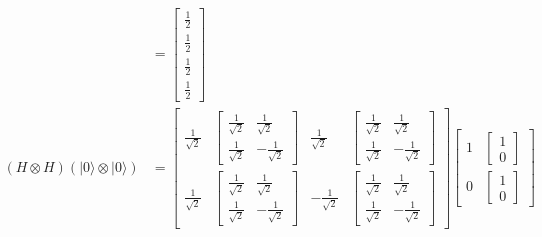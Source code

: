 \documentclass[main.tex]{subfiles}
\begin{document}
\begin{enumerate}
\begin{enumerate}
\begin{align*}
                                        & = \left[\begin{array}{l}\frac{1}{2}\\\frac{1}{2}\\\frac{1}{2}\\\frac{1}{2}\end{array}\right]\\
        \left(H \otimes H\right)
        \left(|0\rangle
        \otimes|0\rangle\right)         & = \left[\begin{array}{llll} 
                                        \frac{1}{\sqrt{2}} 
                                        & {\left[\begin{array}{ll} \frac{1}{\sqrt{2}} & \frac{1}{\sqrt{2}} \\ 
                                        \frac{1}{\sqrt{2}} & - \frac{1}{\sqrt{2}} \end{array}\right]}
                                        & \frac{1}{\sqrt{2}} 
                                        & {\left[\begin{array}{ll} \frac{1}{\sqrt{2}} & \frac{1}{\sqrt{2}} \\ 
                                        \frac{1}{\sqrt{2}} & - \frac{1}{\sqrt{2}} \end{array}\right]}\\
                                        \frac{1}{\sqrt{2}} 
                                        & {\left[\begin{array}{ll} \frac{1}{\sqrt{2}} & \frac{1}{\sqrt{2}} \\ 
                                        \frac{1}{\sqrt{2}} & - \frac{1}{\sqrt{2}} \end{array}\right]}
                                        & - \frac{1}{\sqrt{2}} 
                                        & {\left[\begin{array}{ll} \frac{1}{\sqrt{2}} & \frac{1}{\sqrt{2}} \\ 
                                        \frac{1}{\sqrt{2}} & - \frac{1}{\sqrt{2}} \end{array}\right]}
                                        \end{array}\right]
                                        \left[\begin{array}{ll} 1 & {\left[\begin{array}{l} 1 \\ 0 \end{array}\right]} \\
                                        0 & {\left[\begin{array}{l} 1 \\ 0 \end{array}\right]} \end{array}\right]\\

\end{align*}
\end{enumerate}
\end{enumerate}
\end{document}
